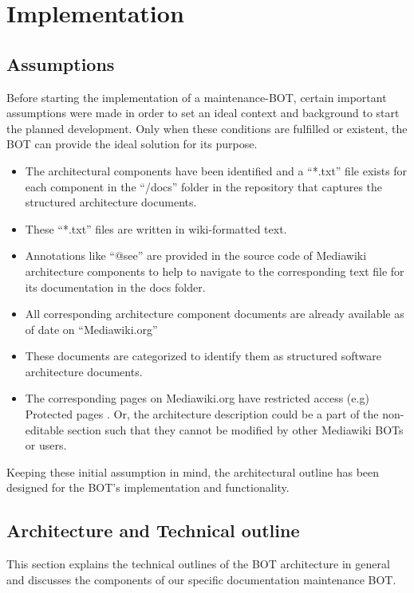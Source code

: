 \chapter{Implementation}\label{chapter:Implementation}

\section{Assumptions}

\indent Before starting the implementation of a maintenance-BOT, certain important assumptions were made in order to set an ideal context and background to start the planned development. Only when these conditions are fulfilled or existent, the BOT can provide the ideal solution for its purpose.
\begin{itemize}
\item The architectural components have been identified and a “*.txt” file exists for each component in the “/docs” folder in the repository that captures the structured architecture documents.
\item These “*.txt” files are written in wiki-formatted text.
\item Annotations like “@see” are provided in the source code of Mediawiki architecture components to help to navigate to the corresponding text file for its documentation in the docs folder.
\item All corresponding architecture component documents are already available as of date on “Mediawiki.org”
\item These documents are categorized to identify them as structured software architecture documents.
\item The corresponding pages on Mediawiki.org have restricted access (e.g) Protected pages \cite{help_pp}. Or, the architecture description could be a part of the non-editable section such that they cannot be modified by other Mediawiki BOTs or users.
\end{itemize}

Keeping these initial assumption in mind, the architectural outline has been designed for the BOT's implementation and functionality. 

\section{Architecture and Technical outline}

This section explains the technical outlines of the BOT architecture in general and discusses the components of our specific documentation maintenance BOT.

